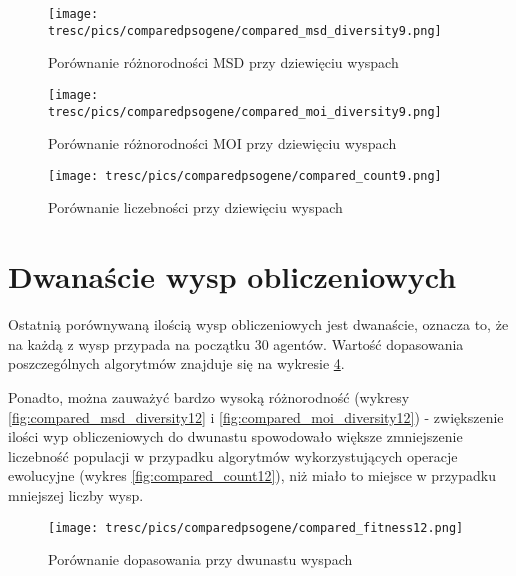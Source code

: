 \clearpage

\begin{figure}[H]
\begin{center} 
\texttt{[image: tresc/pics/comparedpsogene/compared\_msd\_diversity9.png]}
\caption{Porównanie różnorodności MSD przy dziewięciu wyspach}
\label{fig:compared_msd_diversity9}
\end{center}
\end{figure}

\begin{figure}[H]
\begin{center} 
\texttt{[image: tresc/pics/comparedpsogene/compared\_moi\_diversity9.png]}
\caption{Porównanie różnorodności MOI przy dziewięciu wyspach}
\label{fig:compared_moi_diversity9}
\end{center}
\end{figure}

\begin{figure}[H]
\begin{center} 
\texttt{[image: tresc/pics/comparedpsogene/compared\_count9.png]}
\caption{Porównanie liczebności przy dziewięciu wyspach}
\label{fig:compared_count9}
\end{center}
\end{figure}


\section{Dwanaście wysp obliczeniowych}
\label{sec:dwanasciewysp}

Ostatnią porównywaną ilością wysp obliczeniowych jest dwanaście, oznacza to, że na każdą z wysp przypada na początku 30 agentów. Wartość dopasowania poszczególnych algorytmów znajduje się na wykresie \ref{fig:compared_fintess12}.

Ponadto, można zauważyć bardzo wysoką różnorodność (wykresy \ref{fig:compared_msd_diversity12} i \ref{fig:compared_moi_diversity12}) - zwiększenie ilości wyp obliczeniowych do dwunastu spowodowało większe zmniejszenie liczebność populacji w przypadku algorytmów wykorzystujących operacje ewolucyjne (wykres \ref{fig:compared_count12}), niż miało to miejsce w przypadku mniejszej liczby wysp.

\clearpage

\begin{figure}[H]
\begin{center} 
\texttt{[image: tresc/pics/comparedpsogene/compared\_fitness12.png]}
\caption{Porównanie dopasowania przy dwunastu wyspach}
\label{fig:compared_fintess12}
\end{center}
\end{figure}



